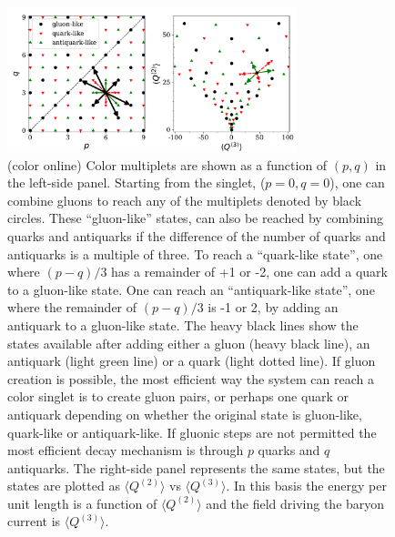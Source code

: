\documentclass[aps, prc, 12pt, nofootinbib, showpacs, superscriptaddress, tightenlines, groupedaddress]{revtex4-2}
\begin{document}
\begin{figure}
\centerline{\includegraphics[width=0.75\textwidth]{figs/pq3.pdf}}
\caption{\label{fig:pq3}(color online)
Color multiplets are shown as a function of $(p,q)$ in the left-side panel. Starting from the singlet, ($p=0,q=0$), one can combine gluons to reach any of the multiplets denoted by black circles. These ``gluon-like'' states,  can also be reached by combining quarks and antiquarks if the difference of the number of quarks and antiquarks is a multiple of three. To reach a ``quark-like state'', one where $(p-q)/3$ has a remainder of +1 or -2, one can add a quark to a gluon-like state. One can reach an ``antiquark-like state'', one where the remainder of $(p-q)/3$ is -1 or 2, by adding an antiquark to a gluon-like state. The heavy black lines show the states available after adding either a gluon (heavy black line), an antiquark (light green line) or a quark (light dotted line). If gluon creation is possible, the most efficient way the system can reach a color singlet is to create gluon pairs, or perhaps one quark or antiquark depending on whether the original state is gluon-like, quark-like or antiquark-like. If gluonic steps are not permitted the most efficient decay mechanism is through $p$ quarks and $q$ antiquarks. The right-side panel represents the same states, but the states are plotted as $\langle Q^{(2)}\rangle$ vs $\langle Q^{(3)}\rangle$. In this basis the energy per unit length is a function of $\langle Q^{(2)}\rangle$ and the field driving the baryon current is $\langle Q^{(3)}\rangle$.}
\end{figure}
\end{document}

